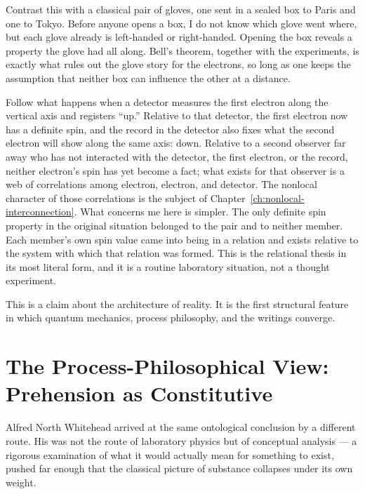 Contrast this with a classical pair of gloves, one sent in a sealed box to Paris and one to Tokyo. Before anyone opens a box, I do not know which glove went where, but each glove already is left-handed or right-handed. Opening the box reveals a property the glove had all along. Bell's theorem, together with the experiments, is exactly what rules out the glove story for the electrons, so long as one keeps the assumption that neither box can influence the other at a distance.

Follow what happens when a detector measures the first electron along the vertical axis and registers ``up.'' Relative to that detector, the first electron now has a definite spin, and the record in the detector also fixes what the second electron will show along the same axis: down. Relative to a second observer far away who has not interacted with the detector, the first electron, or the record, neither electron's spin has yet become a fact; what exists for that observer is a web of correlations among electron, electron, and detector. The nonlocal character of those correlations is the subject of Chapter~\ref{ch:nonlocal-interconnection}. What concerns me here is simpler. The only definite spin property in the original situation belonged to the pair and to neither member. Each member's own spin value came into being in a relation and exists relative to the system with which that relation was formed. This is the relational thesis in its most literal form, and it is a routine laboratory situation, not a thought experiment.

This is a claim about the architecture of reality. It is the first structural feature in which quantum mechanics, process philosophy, and the \bahai writings converge.

\section{The Process-Philosophical View: Prehension as Constitutive}
\label{sec:ch7-process}

Alfred North Whitehead arrived at the same ontological conclusion by a different route. His was not the route of laboratory physics but of conceptual analysis --- a rigorous examination of what it would actually mean for something to exist, pushed far enough that the classical picture of substance collapses under its own weight.

